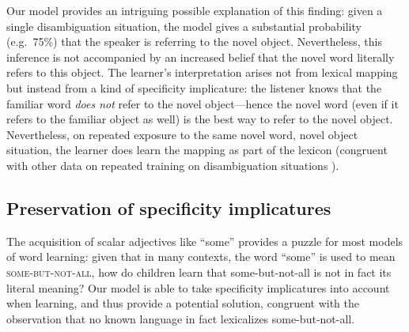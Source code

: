 \documentclass{article} %
\begin{document}
Our model provides an intriguing possible explanation of this finding:
given a single disambiguation situation, the model gives a substantial
probability (e.g.~75\%) that the speaker is referring to the novel
object. Nevertheless, this inference is not accompanied by an increased belief
that the novel word literally refers to this object. The learner's
interpretation arises not from lexical mapping but instead from a kind
of 
specificity implicature: the listener knows that the familiar word
\emph{does not} refer to the novel object---hence the novel word (even
if it refers to the familiar object as well) is the best way to refer
to the novel object. Nevertheless, on repeated exposure to the same
novel word, novel object situation, the learner does learn the mapping
as part of the lexicon (congruent with other data on repeated training
on disambiguation situations \cite{bion2012}).


\subsection{Preservation of specificity implicatures}
\label{sec:learning-specificity-implic}



The acquisition of scalar adjectives like ``some'' provides a puzzle
for most models of word learning: given that in many contexts, the
word ``some'' is used to mean \textsc{some-but-not-all}, how do
children learn that {\sc some-but-not-all} is not in fact its literal meaning? Our model
is able to take specificity implicatures into account when learning,
and thus provide a potential solution, congruent with the observation
that no known language in fact lexicalizes {\sc some-but-not-all}.
\end{document}
